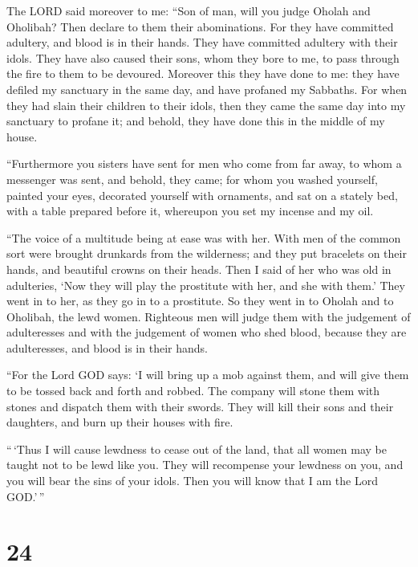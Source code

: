  The LORD said moreover to me: ``Son of man, will you judge
Oholah and Oholibah? Then declare to them their abominations.
 For they have committed adultery, and blood is in their
hands. They have committed adultery with their idols. They have also
caused their sons, whom they bore to me, to pass through the fire to
them to be devoured.  Moreover this they have done to me:
they have defiled my sanctuary in the same day, and have profaned my
Sabbaths.  For when they had slain their children to their
idols, then they came the same day into my sanctuary to profane it; and
behold, they have done this in the middle of my house.

 ``Furthermore you sisters have sent for men who come from
far away, to whom a messenger was sent, and behold, they came; for whom
you washed yourself, painted your eyes, decorated yourself with
ornaments,  and sat on a stately bed, with a table prepared
before it, whereupon you set my incense and my oil.

 ``The voice of a multitude being at ease was with her.
With men of the common sort were brought drunkards from the wilderness;
and they put bracelets on their hands, and beautiful crowns on their
heads.  Then I said of her who was old in adulteries, `Now
they will play the prostitute with her, and she with them.'
 They went in to her, as they go in to a prostitute. So
they went in to Oholah and to Oholibah, the lewd women. 
Righteous men will judge them with the judgement of adulteresses and
with the judgement of women who shed blood, because they are
adulteresses, and blood is in their hands.

 ``For the Lord GOD says: `I will bring up a mob against
them, and will give them to be tossed back and forth and robbed.
 The company will stone them with stones and dispatch them
with their swords. They will kill their sons and their daughters, and
burn up their houses with fire.

 ``\,`Thus I will cause lewdness to cease out of the land,
that all women may be taught not to be lewd like you.  They
will recompense your lewdness on you, and you will bear the sins of your
idols. Then you will know that I am the Lord GOD.'\,''

\hypertarget{section-22}{%
\section{24}\label{section-22}}

